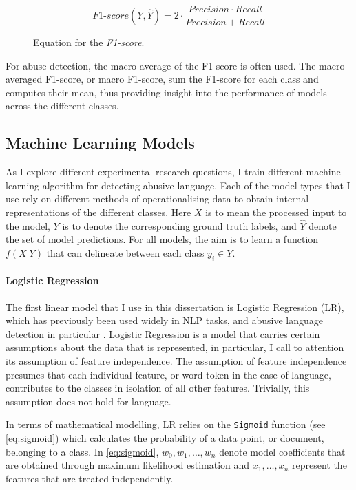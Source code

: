 \begin{figure}[h]
  \begin{equation}\label{eq:f1score}
    \mathit{F1}\text{-}score(Y,\hat{Y}) = 2\cdot\frac{Precision \cdot Recall}{Precision + Recall}
  \end{equation}
  \caption{Equation for the \textit{F1-score}.}
\end{figure}

For abuse detection, the macro average of the F1-score is often used. The macro averaged F1-score, or macro F1-score, sum the F1-score for each class and computes their mean, thus providing insight into the performance of models across the different classes.

\subsection{Machine Learning Models}

As I explore different experimental research questions, I train different machine learning algorithm for detecting abusive language. Each of the model types that I use rely on different methods of operationalising data to obtain internal representations of the different classes. Here $X$ is to mean the processed input to the model, $Y$ is to denote the corresponding ground truth labels, and $\hat{Y}$ denote the set of model predictions. For all models, the aim is to learn a function $f(X|Y)$ that can delineate between each class $y_i\in Y$.

\paragraph{Logistic Regression}
The first linear model that I use in this dissertation is Logistic Regression (LR), which has previously been used widely in NLP tasks, and abusive language detection in particular \citep{LR papers}. Logistic Regression is a model that carries certain assumptions about the data that is represented, in particular, I call to attention its assumption of feature independence. The assumption of feature independence presumes that each individual feature, or word token in the case of language, contributes to the classes in isolation of all other features. Trivially, this assumption does not hold for language.

In terms of mathematical modelling, LR relies on the \texttt{Sigmoid} function (see \autoref{eq:sigmoid}) which calculates the probability of a data point, or document, belonging to a class. In \autoref{eq:sigmoid}, $w_0, w_1, \ldots, w_n$ denote model coefficients that are obtained through maximum likelihood estimation and $x_1, \ldots, x_n$ represent the features that are treated independently.

